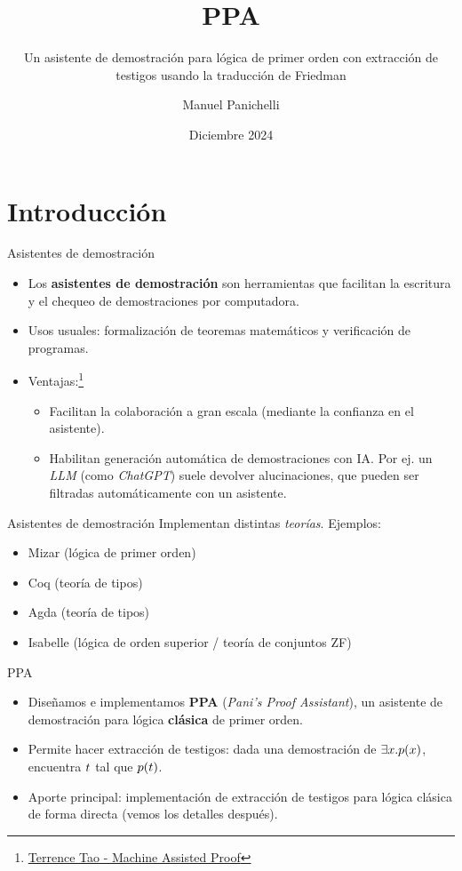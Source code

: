\documentclass[xcolor={dvipsnames},spanish]{beamer}
\title{PPA}
\subtitle{Un asistente de demostración para
lógica de primer orden con extracción de
testigos usando la traducción de Friedman}
\author{Manuel Panichelli}
\institute{Deparatamento de Computación, FCEyN, UBA}
\date{Diciembre 2024}
\begin{document}
\frame{\titlepage}

\section{Introducción}

\begin{frame}{Asistentes de demostración}
    \begin{itemize}
        \item Los \textbf{asistentes de demostración} son herramientas que
        facilitan la escritura y el chequeo de demostraciones por
        computadora.
        \item Usos usuales: formalización de teoremas matemáticos y verificación de programas.
        \item Ventajas:\footnote{\href{https://youtu.be/AayZuuDDKP0?si=eGETzgh9PQ_8JecR}{Terrence Tao - Machine Assisted Proof}}
        \begin{itemize}
            \item Facilitan la colaboración a gran escala (mediante la confianza en el asistente).
            \item Habilitan generación automática de demostraciones con IA. Por ej. un \textit{LLM} (como \textit{ChatGPT}) suele devolver alucinaciones, que pueden ser filtradas automáticamente con un asistente.
        \end{itemize}
    \end{itemize}
\end{frame}

\begin{frame}{Asistentes de demostración}
    Implementan distintas \textit{teorías}. 
    Ejemplos:
    \begin{itemize}
        \item Mizar (lógica de primer orden)
        \item Coq (teoría de tipos)
        \item Agda (teoría de tipos)
        \item Isabelle (lógica de orden superior / teoría de conjuntos ZF)
    \end{itemize}
\end{frame}

\begin{frame}{PPA}
    \begin{itemize}
        \item Diseñamos e implementamos \textbf{PPA} (\textit{Pani's Proof
        Assistant}), un asistente de demostración para lógica \textbf{clásica}
        de primer orden.
        \item Permite hacer extracción de testigos: dada una demostración de
        $\exists x . p(x)$, encuentra $t$ tal que $p(t)$.
        \item Aporte principal: implementación de extracción de testigos para lógica clásica de forma directa (vemos los detalles después).
    \end{itemize}
    
\end{frame}
\end{document}
